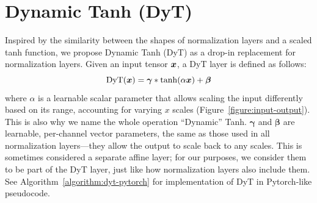
\section{Dynamic Tanh (DyT)}

Inspired by the similarity between the shapes of normalization layers and a scaled tanh function, we propose Dynamic Tanh (DyT) as a drop-in replacement for normalization layers. Given an input tensor ${\bm{x}}$, a DyT layer is defined as follows:
\begin{equation}
\mathrm{DyT}({\bm{x}}) = \bm{\gamma} * \tanh(\alpha {\bm{x}}) + \bm{\beta}
\end{equation}
where $\alpha$ is a learnable scalar parameter that allows scaling the input differently based on its range, accounting for varying $x$ scales (Figure~\ref{figure:input-output}). This is also why we name the whole operation ``Dynamic'' Tanh.
$\bm{\gamma}$ and $\bm{\beta}$ are learnable, per-channel vector parameters, the same as those used in all normalization layers---they allow the output to scale back to any scales. This is sometimes considered a separate affine layer; for our purposes, we consider them to be part of the DyT layer, just like how normalization layers also include them. See Algorithm~\ref{algorithm:dyt-pytorch} for implementation of DyT in Pytorch-like pseudocode.




